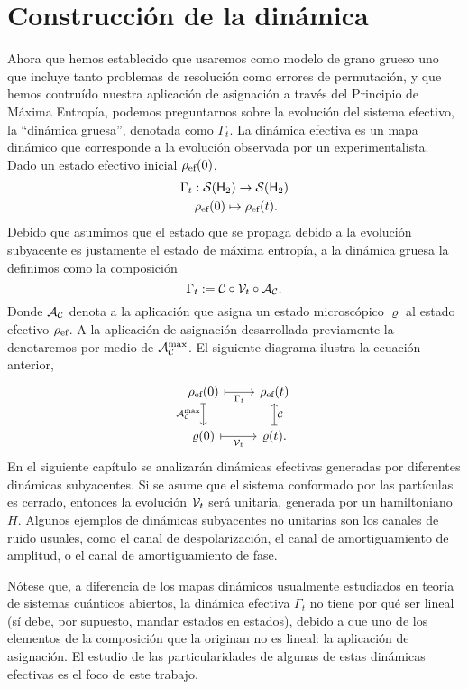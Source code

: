 \section{Construcción de la dinámica}\label{sec:ch2dycon}

Ahora que hemos establecido que usaremos como modelo de grano grueso uno que incluye tanto problemas de resolución como errores de permutación, y que hemos contruído nuestra aplicación de asignación a través del Principio de Máxima Entropía, podemos preguntarnos sobre la evolución del sistema efectivo, la ``dinámica gruesa'', denotada como $\Gamma_t$. La dinámica efectiva es un mapa dinámico que corresponde a la evolución observada por un experimentalista. Dado un estado efectivo inicial $\rho_{\text{ef}}(0)$,
\begin{gather}
\Gamma_{t}:\mcS(\hilbert_2)\rightarrow \mcS(\hilbert_2)\nonumber\\
\rho_{\ef}(0) \mapsto \rho_{\ef}(t)\rlap{.}\nonumber
\end{gather}
Debido que asumimos que el estado que se propaga debido a la evolución subyacente es justamente el estado de máxima entropía, a la dinámica gruesa la definimos como la composición
\begin{equation}
\Gamma_t:=\mathcal{C} \circ \mathcal{V}_t \circ \mathcal{A}_{\mathcal{C}}.\nonumber
\end{equation}
Donde $\mathcal{A}_{\mathcal{C}}$ denota a la aplicación que asigna un estado microscópico $\varrho$ al estado efectivo $\rho_{\text{ef}}$. A la aplicación de asignación desarrollada previamente la denotaremos por medio de $\mathcal{A}_{\mathcal{C}}^{\max}$. El siguiente diagrama ilustra la ecuación anterior,
\[\begin{tikzcd}[arrows={<-|}]
    \rho_{\ef}(0)  & \rho_{\ef}(t) \arrow{l}{\Gamma_{t}} \arrow{d}{\mcC}\\
\varrho(0) \arrow{u}{\mcA_{\mcC}^{\max}} & \varrho(t). \arrow{l}{\mcV_{t}}
\end{tikzcd}
\]
En el siguiente capítulo se analizarán dinámicas efectivas generadas por diferentes dinámicas subyacentes. Si se asume que el sistema conformado por las partículas es cerrado, entonces la evolución $\mathcal{V}_{t}$ será unitaria, generada por un hamiltoniano $H$. Algunos ejemplos de dinámicas subyacentes no unitarias son los canales de ruido usuales, como el canal de despolarización, el canal de amortiguamiento de amplitud, o el canal de amortiguamiento de fase.

Nótese que, a diferencia de los mapas dinámicos usualmente estudiados en teoría de sistemas cuánticos abiertos, la dinámica efectiva $\Gamma_{t}$ no tiene por qué ser lineal (sí debe, por supuesto, mandar estados en estados), debido a que uno de los elementos de la composición que la originan no es lineal: la aplicación de asignación. El estudio de las particularidades de algunas de estas dinámicas efectivas es el foco de este trabajo.


